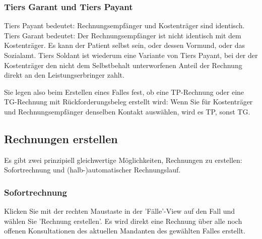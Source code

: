 \documentclass[a4paper]{scrartcl}
\begin{document}
\subsubsection{Tiers Garant und Tiers Payant}
  
Tiers Payant bedeutet: Rechnungsempfänger und Kostenträger sind identisch. Tiers Garant bedeutet: Der Rechnungsempfänger ist nicht identisch mit dem Kostenträger. Es kann der Patient selbst sein, oder dessen Vormund, oder das Sozialamt. Tiers Soldant ist wiederum eine Variante von Tiers Payant, bei der der Kostenträger den nicht dem Selbstbehalt unterworfenen Anteil der Rechnung direkt an den Leistungserbringer zahlt.

Sie legen also beim Erstellen eines Falles fest, ob eine TP-Rechnung oder eine TG-Rechnung mit Rückforderungsbeleg erstellt wird: Wenn Sie für Kostenträger und Rechnungsempfänger denselben Kontakt auswählen, wird es TP, sonst TG.

\subsection{Rechnungen erstellen}
Es gibt zwei prinzipiell gleichwertige Möglichkeiten, Rechnungen zu erstellen: Sofortrechnung und (halb-)automatischer Rechnungslauf.

\subsubsection{Sofortrechnung}
Klicken Sie mit der rechten Maustaste in der 'Fälle'-View auf den Fall und wählen Sie 'Rechnung erstellen'. Es wird direkt eine Rechnung über alle noch offenen Konsultationen des aktuellen Mandanten des gewählten Falles erstellt.
\end{document}
